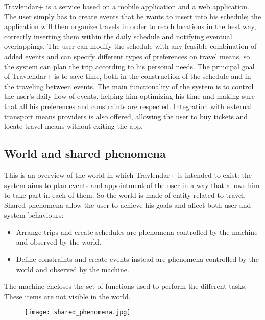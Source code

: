 Travlendar+ is a service based on a mobile application and a web application.
\newline
\newline
The user simply has to create events that he wants to insert into his schedule; the application will then organize travels in order to reach locations in the best way, correctly inserting them within the daily schedule and notifying eventual overlappings. \newline
The user can modify the schedule with any feasible combination of added events and can specify different types of preferences on travel means, so the system can plan the trip according to his personal needs.
\newline
\newline
The principal goal of Travlendar+ is to save time, both in the construction of the schedule and in the traveling between events.
The main functionality of the system is to control the user's daily flow of events, helping him optimizing his time and making sure that all his preferences and constraints are respected.
Integration with external transport means providers is also offered, allowing the user to buy tickets and locate travel means without exiting the app.
\newline

\subsection{World and shared phenomena}
This is an overview of the world in which Travlendar+ is intended to exist: the system aims to plan events and appointment of the user in a way that allows him to take part in each of them. So the world is made of entity related to travel. 
\newline
\newline
Shared phenomena allow the user to achieve his goals and affect both user and system behaviours:
\begin{itemize}
	\item Arrange trips and create schedules are phenomena controlled by the machine and observed by the world. 
	\item Define constraints and create events instead are phenomena controlled by the world and observed by the machine.
\end{itemize}
The machine encloses the set of functions used to perform the different tasks. These items are not visible in the world.
\newline
\begin{figure} [h]
\centering
\texttt{[image: shared\_phenomena.jpg]}
\end{figure}
